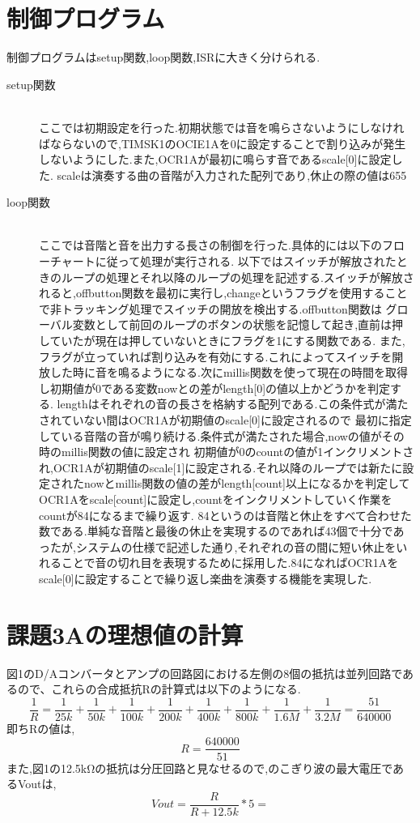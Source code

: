 \documentclass[dvipdfmx]{jarticle}
\begin{document}
\section{制御プログラム}
制御プログラムはsetup関数,loop関数,ISRに大きく分けられる.
\begin{description}
    \item[setup関数]\mbox{}\\
    ここでは初期設定を行った.初期状態では音を鳴らさないようにしなければならないので,TIMSK1のOCIE1Aを0に設定することで割り込みが発生しないようにした.また,OCR1Aが最初に鳴らす音であるscale[0]に設定した.
    scaleは演奏する曲の音階が入力された配列であり,休止の際の値は655
    \item[loop関数]\mbox{}\\
    ここでは音階と音を出力する長さの制御を行った.具体的には以下のフローチャートに従って処理が実行される.
    以下ではスイッチが解放されたときのループの処理とそれ以降のループの処理を記述する.スイッチが解放されると,offbutton関数を最初に実行し,changeというフラグを使用することで非トラッキング処理でスイッチの開放を検出する.offbutton関数は
    グローバル変数として前回のループのボタンの状態を記憶して起き,直前は押していたが現在は押していないときにフラグを1にする関数である.
    また, フラグが立っていれば割り込みを有効にする.これによってスイッチを開放した時に音を鳴るようになる.次にmillis関数を使って現在の時間を取得し初期値が0である変数nowとの差がlength[0]の値以上かどうかを判定する.
    lengthはそれぞれの音の長さを格納する配列である.この条件式が満たされていない間はOCR1Aが初期値のscale[0]に設定されるので  最初に指定している音階の音が鳴り続ける.条件式が満たされた場合,nowの値がその時のmillis関数の値に設定され
    初期値が0のcountの値が1インクリメントされ,OCR1Aが初期値のscale[1]に設定される.それ以降のループでは新たに設定されたnowとmillis関数の値の差がlength[count]以上になるかを判定してOCR1Aをscale[count]に設定し,countをインクリメントしていく作業をcountが84になるまで繰り返す.
    84というのは音階と休止をすべて合わせた数である.単純な音階と最後の休止を実現するのであれば43個で十分であったが,システムの仕様で記述した通り,それぞれの音の間に短い休止をいれることで音の切れ目を表現するために採用した.84になればOCR1Aをscale[0]に設定することで繰り返し楽曲を演奏する機能を実現した.
\end{description}
\section{課題3Aの理想値の計算}
図1のD/Aコンバータとアンプの回路図における左側の8個の抵抗は並列回路であるので、これらの合成抵抗Rの計算式は以下のようになる.
\begin{equation}
\frac{1}{R}=\frac{1}{25k}+\frac{1}{50k}+\frac{1}{100k}+\frac{1}{200k}+\frac{1}{400k}+\frac{1}{800k}+\frac{1}{1.6M}+\frac{1}{3.2M}=\frac{51}{640000}
\end{equation}
即ちRの値は,
\begin{equation}
    R=\frac{640000}{51}
\end{equation}
また,図1の12.5kΩの抵抗は分圧回路と見なせるので\cite{0},のこぎり波の最大電圧であるVoutは,
\begin{equation}
    Vout = \frac{R}{R+12.5k}*5 = 
\end{equation}
\end{document}
